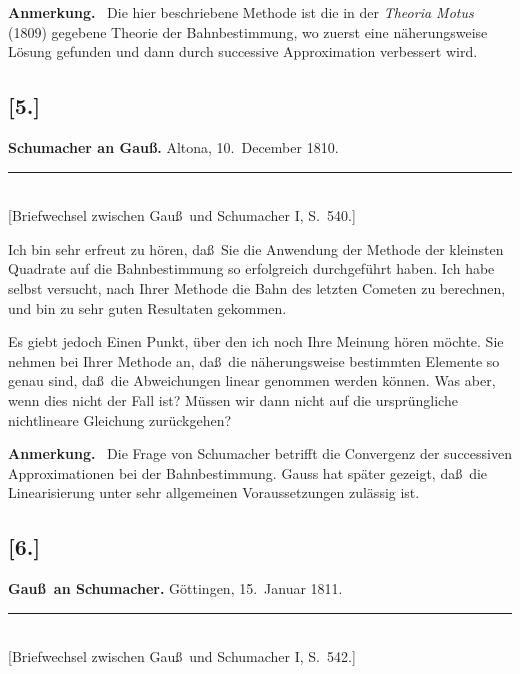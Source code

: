 \documentclass[12pt,a4paper]{article}
\theoremstyle{plain}
\theoremstyle{definition}
\theoremstyle{remark}
\begin{document}
\medskip

\textbf{Anmerkung.} \ Die hier beschriebene Methode ist die in der
\textit{Theoria Motus} (1809) gegebene Theorie der Bahnbestimmung,
wo zuerst eine n\"aherungsweise L\"osung gefunden und dann durch
successive Approximation verbessert wird.


\subsection*{[5.]}
\begin{center}
\textbf{Schumacher an Gau\ss.} Altona, 10.~December 1810.
\end{center}
\begin{center}
\rule{6cm}{0.4pt}\\[4pt]
[Briefwechsel zwischen Gau\ss\ und Schumacher I, S.~540.]
\end{center}

Ich bin sehr erfreut zu h\"oren, da\ss\ Sie die Anwendung der
Methode der kleinsten Quadrate auf die Bahnbestimmung so erfolgreich
durchgef\"uhrt haben. Ich habe selbst versucht, nach Ihrer Methode
die Bahn des letzten Cometen zu berechnen, und bin zu sehr guten
Resultaten gekommen.

Es giebt jedoch Einen Punkt, \"uber den ich noch Ihre Meinung h\"oren
m\"ochte. Sie nehmen bei Ihrer Methode an, da\ss\ die
n\"aherungsweise bestimmten Elemente so genau sind, da\ss\ die
Abweichungen linear genommen werden k\"onnen. Was aber, wenn dies
nicht der Fall ist? M\"ussen wir dann nicht auf die urspr\"ungliche
nichtlineare Gleichung zur\"uckgehen?

\medskip

\textbf{Anmerkung.} \ Die Frage von {\sc Schumacher} betrifft die
Convergenz der successiven Approximationen bei der Bahnbestimmung.
{\sc Gauss} hat sp\"ater gezeigt, da\ss\ die Linearisierung unter
sehr allgemeinen Voraussetzungen zul\"assig ist.


\subsection*{[6.]}
\begin{center}
\textbf{Gau\ss\ an Schumacher.} G\"ottingen, 15.~Januar 1811.
\end{center}
\begin{center}
\rule{6cm}{0.4pt}\\[4pt]
[Briefwechsel zwischen Gau\ss\ und Schumacher I, S.~542.]
\end{center}
\end{document}
